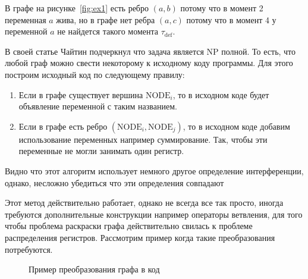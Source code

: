 \documentclass[12pt]{article}
\begin{document}
В графе на рисунке~\ref{fig:ex1} есть ребро $(a, b)$ потому что в момент 2 переменная $a$ жива, но в графе нет ребра $(a, c)$
потому что в момент 4 у переменной $a$ не найдется такого момента $\tau_{\text{def}}$.

В своей статье Чайтин подчеркнул что задача является NP полной. То есть, что любой граф можно свести
некоторому к исходному коду программы. Для этого построим исходный код по следующему правилу:

\begin{enumerate}
    \item Если в графе существует вершина $\text{NODE}_i$, то в исходном коде будет объявление переменной с таким
    названием.
    \item Если в графе есть ребро $(\text{NODE}_i, \text{NODE}_j)$, то в исходном коде добавим использование переменных
    например суммирование. Так, чтобы эти переменные не могли занимать один регистр.
\end{enumerate}

Видно что этот алгоритм использует немного другое определение интерференции, однако, несложно убедиться что эти определения
совпадают

Этот метод действительно работает, однако не всегда все так просто, иногда требуются дополнительные конструкции например операторы ветвления,
для того чтобы проблема раскраски графа действительно свилась к проблеме распределения регистров. Рассмотрим пример когда такие
преобразования потребуются.

\begin{figure}[H]
    \centering
\caption{Пример преобразования графа в код}
\label{fig:ex2}
\end{figure}
\end{document}
